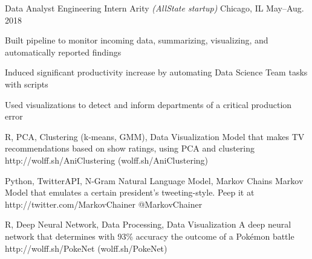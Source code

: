 \documentclass[10pt, letterpaper]{awesome-cv}
\begin{document}
\begin{cventries}
    \cventry
        {Data Analyst Engineering Intern}
        {Arity \textit{(AllState startup)}}
        {Chicago, IL}
        {May--Aug. 2018}
        {\begin{cvitems} 
            \item Built pipeline to monitor incoming data, summarizing, visualizing, and automatically reported findings
            \item Induced significant productivity increase by automating Data Science Team tasks with scripts
            \item Used visualizations to detect and inform departments of a critical production error
            \end{cvitems}}
            
\end{cventries}

\begin{projects}
    {R, PCA, Clustering (k-means, GMM), Data Visualization}
    {Model that makes TV recommendations based on show ratings, using PCA and clustering}
    {http://wolff.sh/AniClustering}
    {(wolff.sh/AniClustering)}
    
    {Python, TwitterAPI, N-Gram Natural Language Model, Markov Chains}
    {Markov Model that emulates a certain president's tweeting-style. Peep it at}
    {http://twitter.com/MarkovChainer}
    {@MarkovChainer}
    
    {R, Deep Neural Network, Data Processing, Data Visualization}
    {A deep neural network that determines with 93\% accuracy the outcome of a Pokémon battle}
    {http://wolff.sh/PokeNet}
    {(wolff.sh/PokeNet)}
    
    
\end{projects}
    
\end{document}
